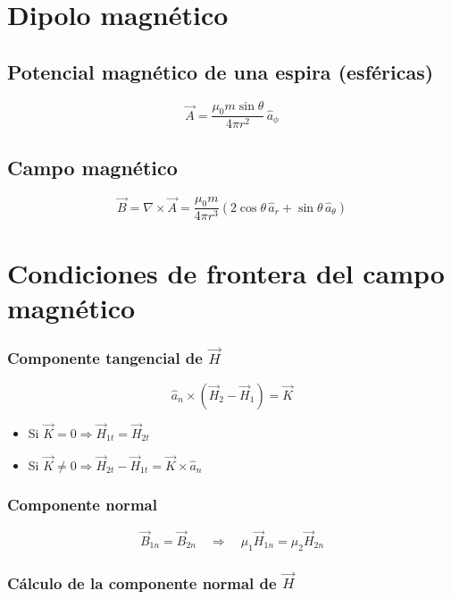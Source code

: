 \documentclass[11pt]{article}
\begin{document}
\begin{multicols}{2}

\section*{Dipolo magnético}

\subsection*{Potencial magnético de una espira (esféricas)}


\[
\vec{A} = \frac{\mu_0 m \sin\theta}{4\pi r^2} \, \hat{a}_\phi
\]


\subsection*{Campo magnético}


\[
\vec{B} = \nabla \times \vec{A} = \frac{\mu_0 m}{4\pi r^3} \left( 2\cos\theta \, \hat{a}_r + \sin\theta \, \hat{a}_\theta \right)
\]

\section*{Condiciones de frontera del campo magnético}

\subsubsection*{Componente tangencial de \( \vec{H} \)}

\[
\hat{a}_n \times \left( \vec{H}_2 - \vec{H}_1 \right) = \vec{K}
\]

\begin{itemize}
  \item Si \( \vec{K} = 0 \Rightarrow \vec{H}_{1t} = \vec{H}_{2t} \)
  \item Si \( \vec{K} \neq 0 \Rightarrow \vec{H}_{2t} - \vec{H}_{1t} = \vec{K} \times \hat{a}_n \)
\end{itemize}

\subsubsection*{Componente normal}

\[
\vec{B}_{1n} = \vec{B}_{2n}
\quad \Rightarrow \quad \mu_1 \vec{H}_{1n} = \mu_2 \vec{H}_{2n}
\]

\subsubsection*{Cálculo de la componente normal de \( \vec{H} \)}


\end{multicols}
\end{document}
